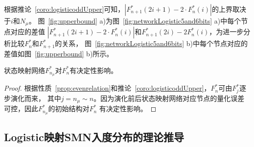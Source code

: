 根据推论~\ref{coro:logisticoddUpper}可知，$|F^*_{n+1}(2i+1)-2\cdot F^*_n(i)|$的上界取决于$i$和$N_{\mu}$。
图~\ref{fig:upperbound} a)为图~\ref{fig:networkLogistic5and6bits} a)中每个节点对应的差值
$|F^*_{n+1}(2i+1)-2\cdot F^*_n(i)|$和$F^*_{n+1}(2i)-2F^*_n(i)$，为进一步分析比较$F^*_{n}$和$F^*_{n+1}$的关系，
图~\ref{fig:networkLogistic5and6bits} b)中每个节点对应的差值如图~\ref{fig:upperbound} b)所示。

\begin{Property}
状态映射网络$F^*_{n_\mu}$对$F^*_{n}$有决定性影响。
\label{prop:dominate}
\end{Property}
\begin{proof}
根据性质~\ref{prop:evenrelation}和推论~\ref{coro:logisticoddUpper}，$F^*_{n}$可由$F^*_{j}$逐步演化而来，
其中$j=n_\mu\sim n$。因为演化前后状态映射网络对应节点的量化误差可控，因此$F^*_{n_\mu}$的初始结构对$F^*_{n}$
有决定性影响。\qedsymbol
\end{proof}

\subsection{Logistic映射SMN入度分布的理论推导}

